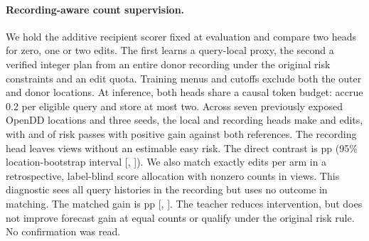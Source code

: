 \paragraph{Recording-aware count supervision.}
We hold the additive recipient scorer fixed at evaluation and compare
two heads for zero, one or two edits. The first learns a query-local
proxy, the second a verified integer plan from an entire donor
recording under the original risk constraints and an edit quota.
Training menus and cutoffs exclude both the outer and donor locations.
At inference, both heads share a causal token budget: accrue 0.2 per
eligible query and store at most two. Across seven previously exposed
OpenDD locations and three seeds, the local and recording heads make
\RecordingCountLocalN{} and \RecordingCountRecordN{} edits, with
\RecordingCountLocalPass{} and \RecordingCountRecordPass{} of
\RecordingCountViews{} risk passes with positive gain against both
references. The recording head leaves \RecordingCountUndefined{} views
without an estimable easy risk. The direct contrast is
\RecordingCountGap{} pp (95\% location-bootstrap interval
[\RecordingCountGapLow{}, \RecordingCountGapHigh{}]). We also match
exactly \RecordingCountMatchedN{} edits per arm in a retrospective,
label-blind score allocation with nonzero counts in
\RecordingCountMatchedViews{} views. This diagnostic sees all query
histories in the recording but uses no outcome in matching. The matched
gain is \RecordingCountMatched{} pp
[\RecordingCountMatchLow{}, \RecordingCountMatchHigh{}]. The teacher
reduces intervention, but does not improve forecast gain at equal
counts or qualify under the original risk rule. No confirmation was read.
